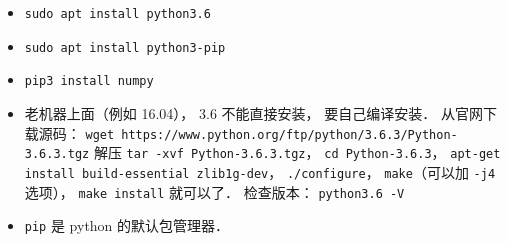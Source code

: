 

\begin{itemize}
\item \verb|sudo apt install python3.6|
\item \verb|sudo apt install python3-pip|
\item \verb|pip3 install numpy|
\item 老机器上面（例如 16.04）， 3.6 不能直接安装， 要自己编译安装． 从官网下载源码： \verb|wget https://www.python.org/ftp/python/3.6.3/Python-3.6.3.tgz| 解压 \verb|tar -xvf Python-3.6.3.tgz|， \verb|cd Python-3.6.3|， \verb|apt-get install build-essential zlib1g-dev|， \verb|./configure|， \verb|make|（可以加 \verb|-j4| 选项）， \verb|make install| 就可以了． 检查版本： \verb|python3.6 -V|
\item \verb|pip| 是 python 的默认包管理器．
\end{itemize}
